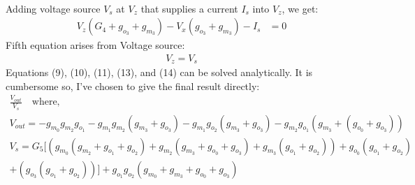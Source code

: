 \begin{enumerate}
\begin{align*}
    \end{align*}
    Adding voltage source $V_s$ at $V_z$ that supplies
    a current $I_s$ into $V_z$, we get:
    \begin{align*}
      V_{z}(G_4 + g_{o_3} + g_{m_3}) - V_{x}(g_{o_3} + g_{m_3}) - I_s &= 0 \tag{13}
    \end{align*}
    Fifth equation arises from Voltage source:
    \begin{align*}
      V_{z} = V_s \tag{14}
    \end{align*}
    Equations (9), (10), (11), (13), and (14) can be
    solved analytically. It is cumbersome so, I've
    chosen to give the final result directly:
    \begin{align*}
      \frac{V_{out}}{V_{s}} \quad \text{where,} \\
      V_{out} = - g_{m_0}g_{m_2}g_{o_1} - g_{m_1}g_{m_2}(g_{m_3} + g_{o_3}) - g_{m_1}g_{o_2}(g_{m_3} + g_{o_3}) - g_{m_2}g_{o_1}(g_{m_3} + (g_{o_0} + g_{o_3})) \\
      V_{s} = G_{5}[(g_{m_0}(g_{m_2} + g_{o_1} + g_{o_2}) + g_{m_2}(g_{m_3} + g_{o_0} + g_{o_3}) + g_{m_3}(g_{o_1} + g_{o_2})) + g_{o_0}(g_{o_1} + g_{o_2}) \\
              + (g_{o_3}(g_{o_1} + g_{o_2}))] + g_{o_1}g_{o_2}(g_{m_0} + g_{m_3} + g_{o_0} + g_{o_3})
    \end{align*}
\end{enumerate}


